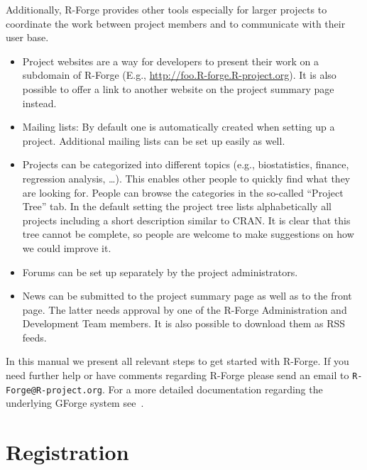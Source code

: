 \documentclass[a4paper]{article}
\newcommand{\RFORGE}{\proglang{R}-Forge Administration and Development Team}
\let\email=\texttt
\newcommand{\proglang}[1]{\textsf{#1}}
\begin{document}
Additionally, \proglang{R}-Forge provides other tools especially for larger
projects to coordinate the work between project members and to
communicate with their user base.

\begin{itemize}
\item Project websites are a way for developers to present their work
  on a subdomain of \proglang{R}-Forge (E.g.,
  \url{http://foo.R-forge.R-project.org}). It is also possible to
  offer a link to another website on the project summary page instead. 
\item Mailing lists: By default one is automatically created when setting up a
  project. Additional mailing lists can be set up easily as well. 
\item Projects can be categorized into different
  topics (e.g., biostatistics, finance, regression analysis,
  \ldots). This enables other people to quickly find what they are
  looking for. People can browse the categories in the so-called
  ``Project Tree'' tab. In the default setting the project tree lists
  alphabetically all projects including a short description similar to
  CRAN. It is clear that this tree cannot be complete, so people are
  welcome to make suggestions on how we could improve it. 
\item Forums can be set up separately by the project
  administrators.%
\item News can be submitted to the project summary page as well as to the
  front page. The latter needs approval by one of the \RFORGE{}
  members. It is also possible to download them as RSS feeds.
\end{itemize} 


In this manual we present all relevant steps to get
started with R-Forge. If you need further help or have
comments regarding \proglang{R}-Forge please send an email to
\email{R-Forge@R-project.org}. For a more detailed
documentation regarding the underlying GForge system
see~\cite{forge:copeland_et_al:2006}. 

\section{Registration}
\label{sec:registration}
\end{document}
